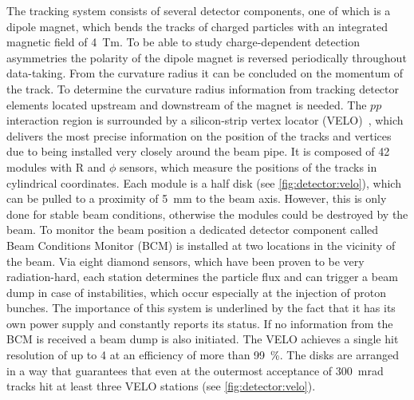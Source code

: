 The tracking system consists of several detector components, one of which is a
dipole magnet, which bends the tracks of charged particles with an integrated
magnetic field of \SI{4}{Tm}. To be able to study charge-dependent detection
asymmetries the polarity of the dipole magnet is reversed periodically
throughout data-taking. From the curvature radius it can be concluded on
the momentum of the track. To determine the curvature radius information from
tracking detector elements located upstream and downstream of the magnet is
needed. The $pp$ interaction region is surrounded by a silicon-strip vertex
locator (VELO)~\cite{LHCb-DP-2014-001}, which delivers the most precise
information on the position of the tracks and vertices due to being installed
very closely around the beam pipe. It is composed of 42 modules with R and
$\phi$ sensors, which measure the positions of the tracks in cylindrical
coordinates. Each module is a half disk (see \cref{fig:detector:velo}), which
can be pulled to a proximity of \SI{5}{\milli\metre} to the beam axis.
However, this is only done for stable beam conditions, otherwise the modules
could be destroyed by the beam. To monitor the beam position a dedicated
detector component called Beam Conditions Monitor (BCM) is installed at two
locations in the vicinity of the beam. Via eight diamond sensors, which have
been proven to be very radiation-hard, each station determines the particle
flux and can trigger a beam dump in case of instabilities, which occur
especially at the injection of proton bunches. The importance of this system
is underlined by the fact that it has its own power supply and constantly
reports its status. If no information from the BCM is received a beam dump is
also initiated. The VELO achieves a single hit resolution of up to \SI{4}{\mum}
at an efficiency of more than \SI{99}{\percent}. The disks are arranged in a
way that guarantees that even at the outermost acceptance of \SI{300}{mrad}
tracks hit at least three VELO stations (see \cref{fig:detector:velo}).
